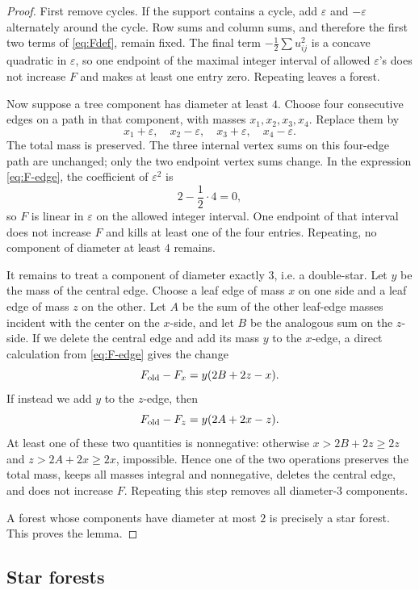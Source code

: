 \documentclass[12pt]{article}
\theoremstyle{plain}
\theoremstyle{definition}
\theoremstyle{remark}
\begin{document}
\begin{proof}
First remove cycles.  If the support contains a cycle, add \(\varepsilon\) and
\(-\varepsilon\) alternately around the cycle.  Row sums and column sums, and
therefore the first two terms of \eqref{eq:Fdef}, remain fixed.  The final
term \(-\frac12\sum u_{ij}^2\) is a concave quadratic in \(\varepsilon\), so one
endpoint of the maximal integer interval of allowed \(\varepsilon\)'s does not
increase \(F\) and makes at least one entry zero.  Repeating leaves a forest.

Now suppose a tree component has diameter at least \(4\).  Choose four
consecutive edges on a path in that component, with masses
\(x_1,x_2,x_3,x_4\).  Replace them by
\[
  x_1+\varepsilon,
  \quad x_2-\varepsilon,
  \quad x_3+\varepsilon,
  \quad x_4-\varepsilon.
\]
The total mass is preserved.  The three internal vertex sums on this four-edge
path are unchanged; only the two endpoint vertex sums change.  In the expression
\eqref{eq:F-edge}, the coefficient of \(\varepsilon^2\) is
\[
  2-\frac12\cdot4=0,
\]
so \(F\) is linear in \(\varepsilon\) on the allowed integer interval.  One
endpoint of that interval does not increase \(F\) and kills at least one of the
four entries.  Repeating, no component of diameter at least \(4\) remains.

It remains to treat a component of diameter exactly \(3\), i.e. a double-star.
Let \(y\) be the mass of the central edge.  Choose a leaf edge of mass \(x\)
on one side and a leaf edge of mass \(z\) on the other.  Let \(A\) be the sum
of the other leaf-edge masses incident with the center on the \(x\)-side, and
let \(B\) be the analogous sum on the \(z\)-side.  If we delete the central
edge and add its mass \(y\) to the \(x\)-edge, a direct calculation from
\eqref{eq:F-edge} gives the change
\[
  F_{\rm old}-F_x = y(2B+2z-x).
\]
If instead we add \(y\) to the \(z\)-edge, then
\[
  F_{\rm old}-F_z = y(2A+2x-z).
\]
At least one of these two quantities is nonnegative: otherwise
\(x>2B+2z\ge2z\) and \(z>2A+2x\ge2x\), impossible.  Hence one of the two
operations preserves the total mass, keeps all masses integral and
nonnegative, deletes the central edge, and does not increase \(F\).  Repeating
this step removes all diameter-\(3\) components.

A forest whose components have diameter at most \(2\) is precisely a star
forest.  This proves the lemma.
\end{proof}

\subsection*{Star forests}
\end{document}
